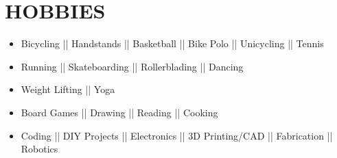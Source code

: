 \section*{HOBBIES}

\vspace{5pt}
\begin{itemize}[label={}, leftmargin=0pt]
    \item Bicycling || Handstands || Basketball || Bike Polo || Unicycling || Tennis 
    \item Running || Skateboarding || Rollerblading || Dancing
    \item Weight Lifting  || Yoga
    \item Board Games || Drawing || Reading || Cooking
    \item Coding || DIY Projects || Electronics || 3D Printing/CAD || Fabrication || Robotics
\end{itemize}
